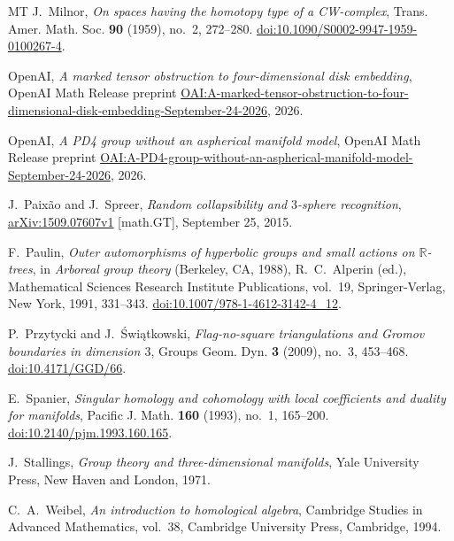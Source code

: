 \begin{thebibliography}{MT}
J.~Milnor,
\emph{On spaces having the homotopy type of a CW-complex},
Trans. Amer. Math. Soc. \textbf{90} (1959), no.~2, 272--280.
\href{https://doi.org/10.1090/S0002-9947-1959-0100267-4}{doi:10.1090/S0002-9947-1959-0100267-4}.

OpenAI, \emph{A marked tensor obstruction to four-dimensional disk embedding},
OpenAI Math Release preprint
\href{https://github.com/openai/math/blob/main/preprints/A-marked-tensor-obstruction-to-four-dimensional-disk-embedding-September-24-2026/paper.pdf}{OAI:A-marked-tensor-obstruction-to-four-dimensional-disk-embedding-September-24-2026},
2026.

OpenAI, \emph{A PD4 group without an aspherical manifold model},
OpenAI Math Release preprint
\href{https://github.com/openai/math/blob/main/preprints/A-PD4-group-without-an-aspherical-manifold-model-September-24-2026/paper.pdf}{OAI:A-PD4-group-without-an-aspherical-manifold-model-September-24-2026},
2026.

J.~Paix\~ao and J.~Spreer,
\emph{Random collapsibility and $3$-sphere recognition},
\href{https://arxiv.org/abs/1509.07607v1}{arXiv:1509.07607v1}
[math.GT], September 25, 2015.

F.~Paulin,
\emph{Outer automorphisms of hyperbolic groups and small actions on $\mathbb R$-trees},
in \emph{Arboreal group theory} (Berkeley, CA, 1988), R.~C.~Alperin (ed.),
Mathematical Sciences Research Institute Publications, vol.~19,
Springer-Verlag, New York, 1991, 331--343.
\href{https://doi.org/10.1007/978-1-4612-3142-4_12}{doi:10.1007/978-1-4612-3142-4\_12}.

P.~Przytycki and J.~\'Swi\k{a}tkowski,
\emph{Flag-no-square triangulations and Gromov boundaries in dimension $3$},
Groups Geom. Dyn. \textbf{3} (2009), no.~3, 453--468.
\href{https://doi.org/10.4171/GGD/66}{doi:10.4171/GGD/66}.

E.~Spanier,
\emph{Singular homology and cohomology with local coefficients and duality for manifolds},
Pacific J. Math. \textbf{160} (1993), no.~1, 165--200.
\href{https://doi.org/10.2140/pjm.1993.160.165}{doi:10.2140/pjm.1993.160.165}.

J.~Stallings,
\emph{Group theory and three-dimensional manifolds},
Yale University Press, New Haven and London, 1971.

C.~A.~Weibel,
\emph{An introduction to homological algebra},
Cambridge Studies in Advanced Mathematics, vol.~38,
Cambridge University Press, Cambridge, 1994.
\end{thebibliography}
